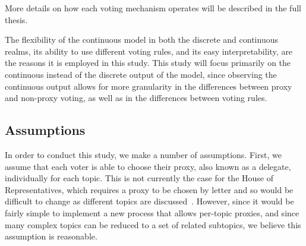 More details on how each voting mechanism operates will be described in the full thesis.

The flexibility of the continuous model in both the discrete and continuous realms, its
ability to use different voting rules, and its easy interpretability, are the reasons
it is employed in this study.
This study will focus primarily on the continuous instead of the discrete output of
the model, since observing the continuous output allows for more granularity in the
differences between proxy and non-proxy voting, as well as in the differences between
voting rules.


\subsection{Assumptions}\label{subsec:assumptions}
In order to conduct this study, we make a number of assumptions.
First, we assume that each voter is able to choose their proxy, also known as a
delegate, individually for each topic.
This is not currently the case for the House of Representatives, which requires
a proxy to be chosen by letter and so would be difficult to change as different
topics are discussed~\cite{Congress.gov2020}.
However, since it would be fairly simple to implement a new process that allows
per-topic proxies, and since many complex topics can be reduced to a set of related
subtopics, we believe this assumption is reasonable.


